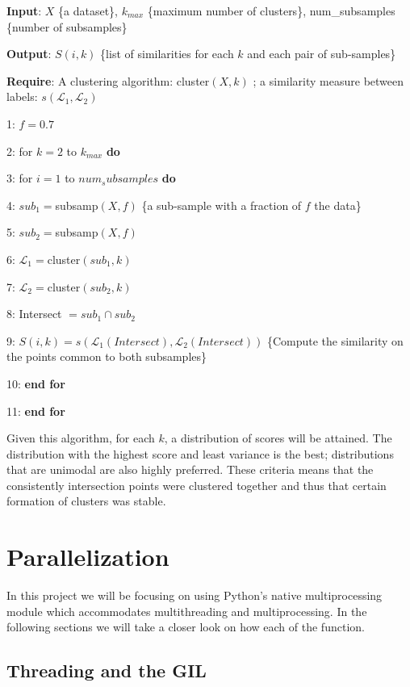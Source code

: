 \documentclass[10pt,twocolumn,letterpaper]{article}
\begin{document}
\begin{algorithm}[H] 
\textbf{Input}: $X$ \{a dataset\}, $k_{max}$ \{maximum number of
clusters\}, num\_subsamples \{number of subsamples\} 

\textbf{Output}: $S(i,k)$ \{list of similarities for each $k$ and
each pair of sub-samples\}

\textbf{Require}: A clustering algorithm: cluster$(X,k)$ ; a similarity
measure between labels: $s(\mathcal{L}_1,\mathcal{L}_2)$

1: $f = 0.7$ 

2: for $k=2$ to $k_{max}$ \textbf{do} 

3: for $i=1$ to $num_subsamples$ \textbf{do} 

4: $sub_1 = $subsamp$(X, f)$ \{a sub-sample with a fraction of $f$
the data\} 

5: $sub_2 = $subsamp$(X, f)$ 

6: $\mathcal{L}_1=$cluster$(sub_1, k)$ 

7: $\mathcal{L}_2=$cluster$(sub_2, k)$ 

8: Intersect $= sub_1 \cap sub_2$

9: $S(i, k) = s(\mathcal{L}_1(Intersect), \mathcal{L}_2(Intersect))$
\{Compute the similarity on the points common to both subsamples\} 

10: \textbf{end for }

11: \textbf{end for}

\caption{\label{alg:stability}}
\end{algorithm}

Given this algorithm, for each $k$, a distribution of scores will be attained. The distribution with the highest score and least variance is the best; distributions that are unimodal are also highly preferred. These criteria means that the consistently intersection points were clustered together and thus that certain formation of clusters was stable. 

\section{Parallelization} \label{parallel}

In this project we will be focusing on using Python's native multiprocessing module which accommodates multithreading and multiprocessing. In the following sections we will take a closer look on how each of the function.

\subsection{Threading and the GIL}
\end{document}

